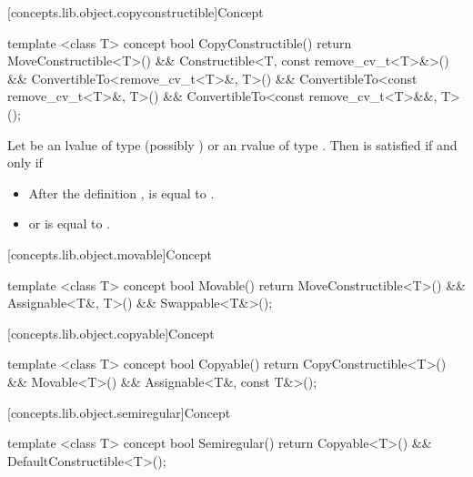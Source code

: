 [concepts.lib.object.copyconstructible]{Concept }

%
\begin{itemdecl}
template <class T>
concept bool CopyConstructible() {
  return MoveConstructible<T>() &&
    Constructible<T, const remove_cv_t<T>&>() &&
    ConvertibleTo<remove_cv_t<T>&, T>() &&
    ConvertibleTo<const remove_cv_t<T>&, T>() &&
    ConvertibleTo<const remove_cv_t<T>&&, T>();
}
\end{itemdecl}

\begin{itemdescr}
\pnum
Let  be an lvalue of type (possibly )
 or an rvalue of type .
Then  is satisfied if and only if

\begin{itemize}
\item After the definition ,  is equal
to .
\item {} or  is equal
to .
\end{itemize}

\end{itemdescr}

[concepts.lib.object.movable]{Concept }

%
\begin{itemdecl}
template <class T>
concept bool Movable() {
  return MoveConstructible<T>() &&
    Assignable<T&, T>() &&
    Swappable<T&>();
}
\end{itemdecl}

[concepts.lib.object.copyable]{Concept }

%
\begin{itemdecl}
template <class T>
concept bool Copyable() {
  return CopyConstructible<T>() &&
    Movable<T>() &&
    Assignable<T&, const T&>();
}
\end{itemdecl}

[concepts.lib.object.semiregular]{Concept }

%
\begin{itemdecl}
template <class T>
concept bool Semiregular() {
  return Copyable<T>() &&
    DefaultConstructible<T>();
}
\end{itemdecl}

